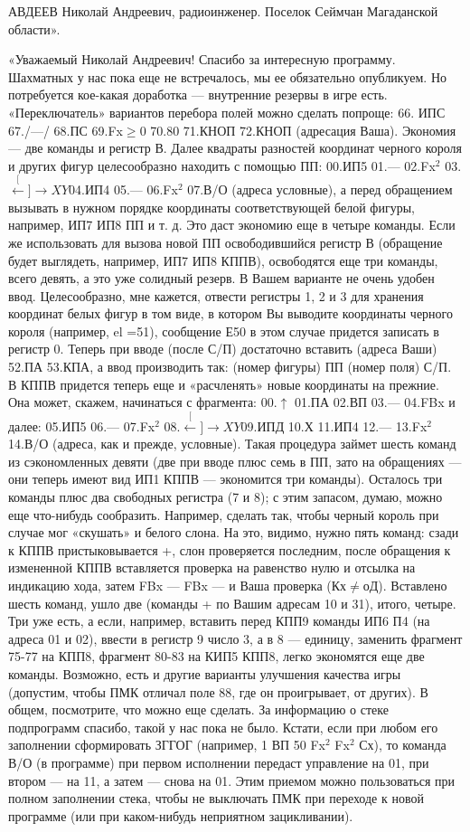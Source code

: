 \documentclass[11pt,a4paper,oneside]{article}
\def\XY{$\stackrel[\leftarrow]{\rightarrow}{XY}$}
\begin{document}
АВДЕЕВ Николай Андреевич,
радиоинженер. Поселок Сеймчан Магаданской области».

«Уважаемый Николай Андреевич! Спасибо за интересную программу. Шахматных у нас пока еще не встречалось, мы ее обязательно опубликуем. Но потребуется кое-какая доработка — внутренние резервы в игре есть. «Переключатель» вариантов перебора полей можно сделать попроще: 66. ИПС 67./—/ 68.ПС 69.Fx$\geq$0 70.80 71.КНОП 72.КНОП (адресация Ваша). Экономия — две команды и регистр В. Далее квадраты разностей координат черного короля и других фигур целесообразно находить с помощью ПП: 00.ИП5 01.— 02.Fx$^{2}$ 03.\XY 04.ИП4 05.— 06.Fx$^{2}$ 07.В/О (адреса условные), а перед обращением вызывать в нужном порядке координаты соответствующей белой фигуры, например, ИП7 ИП8 ПП и т. д. Это даст экономию еще в четыре команды. Если же использовать для вызова новой ПП освободившийся регистр В (обращение будет выглядеть, например, ИП7 ИП8 КППВ), освободятся еще три команды, всего девять, а это уже солидный резерв. В Вашем варианте не очень удобен ввод. Целесообразно, мне кажется, отвести регистры 1, 2 и 3 для хранения координат белых фигур в том виде, в котором Вы выводите координаты черного короля (например, el =51), сообщение Е50 в этом случае придется записать в регистр 0. Теперь при вводе (после С/П) достаточно вставить (адреса Ваши) 52.ПА 53.КПА, а ввод производить так: (номер фигуры) ПП (номер поля) С/П. В КППВ придется теперь еще и «расчленять» новые координаты на прежние. Она может, скажем, начинаться с фрагмента: 00.$\uparrow$ 01.ПА 02.ВП 03.— 04.FBx и далее: 05.ИП5 06.— 07.Fx$^{2}$ 08.\XY 09.ИПД 10.Х	11.ИП4 12.— 13.Fx$^{2}$ 14.В/О (адреса, как и прежде, условные). Такая процедура займет шесть команд из сэкономленных девяти (две при вводе плюс семь в ПП, зато на обращениях — они теперь имеют вид ИП1 КППВ — экономится три команды). Осталось три команды плюс два свободных регистра (7 и 8); с этим запасом, думаю, можно еще что-нибудь сообразить. Например, сделать так, чтобы черный король при случае мог «скушать» и белого слона. На это, видимо, нужно пять команд: сзади к КППВ пристыковывается +, слон проверяется последним, после обращения к измененной КППВ вставляется проверка на равенство нулю и отсылка на индикацию хода, затем FBx — FBx — и Ваша проверка (Кх$\neq$оД). Вставлено шесть команд, ушло две (команды + по Вашим адресам 10 и 31), итого, четыре. Три уже есть, а если, например, вставить перед КПП9 команды ИП6 П4 (на адреса 01 и 02), ввести в регистр 9 число 3, а в 8 — единицу, заменить фрагмент 75-77 на КПП8, фрагмент 80-83 на КИП5 КПП8, легко экономятся еще две команды. Возможно, есть и другие варианты улучшения качества игры (допустим, чтобы ПМК отличал поле 88, где он проигрывает, от других). В общем, посмотрите, что можно еще сделать. За информацию о стеке подпрограмм спасибо, такой у нас пока не было. Кстати, если при любом его заполнении сформировать ЗГГОГ (например, 1 ВП 50 Fx$^{2}$ Fx$^{2}$ Сх), то команда В/О (в программе) при первом исполнении передаст управление на 01, при втором — на 11, а затем — снова на 01. Этим приемом можно пользоваться при полном заполнении стека, чтобы не выключать ПМК при переходе к новой программе (или при каком-нибудь неприятном зацикливании).
\end{document}
